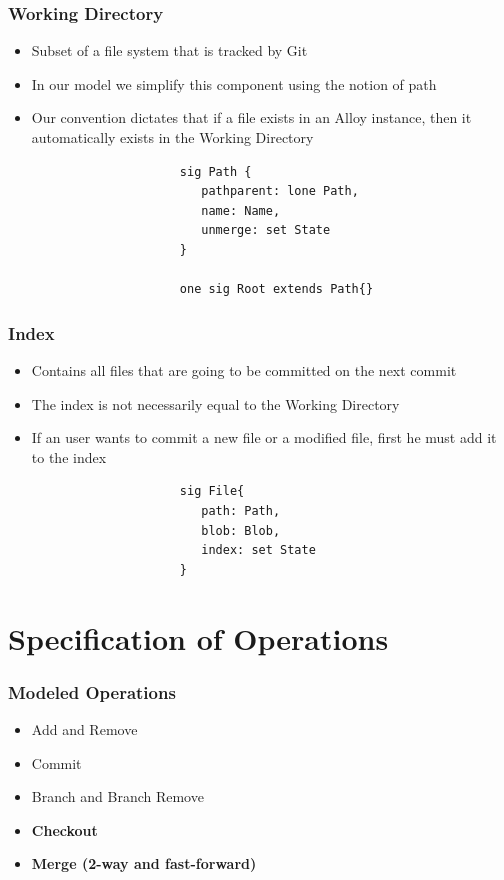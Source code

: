 \documentclass{beamer}
\begin{document}
\begin{frame}[fragile]
   \frametitle{Working Directory}
   \begin{itemize}
      \item Subset of a file system that is tracked by Git
   	\item In our model we simplify this component using the notion
      of path
	   \item Our convention dictates that if a file exists in an Alloy
	   instance, then it automatically exists in the Working Directory
   \end{itemize}
   \tiny
   \color{blue}
   \begin{lstlisting}
                        sig Path {
                           pathparent: lone Path,
                           name: Name,
                           unmerge: set State
                        }

                        one sig Root extends Path{}
   \end{lstlisting}
\end{frame}


\begin{frame}[fragile]
   \frametitle{Index}
   \begin{itemize}
      \item Contains all files that are going to be committed on the next
      commit 
      \item The index is not necessarily equal to the Working Directory
      \item If an user wants to commit a new file or a modified file,
      first he must add it to the index
   \end{itemize}
   \vspace{10mm}
   \tiny
   \color{blue}
   \begin{lstlisting}
                        sig File{
                           path: Path,
                           blob: Blob,
                           index: set State
                        }

   \end{lstlisting}

\end{frame}


\section{Specification of Operations}

\begin{frame}[fragile]
   \frametitle{Modeled Operations}
   \begin{itemize}
      \item Add and Remove
      \item Commit
      \item Branch and Branch Remove
      \item {\bf Checkout}
      \item {\bf Merge (2-way and fast-forward) }
   \end{itemize}
\end{frame}
\end{document}
